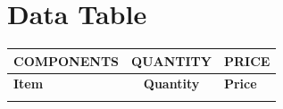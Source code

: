 \documentclass[10pt]{article}
\begin{document}

\section*{Data Table}

\begin{tabularx}{\textwidth}{p{11cm}|c|X}
  \rowcolor{gray!35}
  \textbf{\textcolor{primary_color}{COMPONENTS}} 
  & \textbf{\textcolor{primary_color}{QUANTITY}} 
  & \textbf{\textcolor{primary_color}{PRICE}} \\
  \hline
  \endfirsthead

  \rowcolor{gray!35}
  \textbf{\textcolor{primary_color}{Item}} & \textbf{\textcolor{primary_color}{Quantity}} & \textbf{\textcolor{primary_color}{Price}} \\
  \hline
  \endhead

  \endfoot

  \endlastfoot


\end{tabularx}
\end{document}
